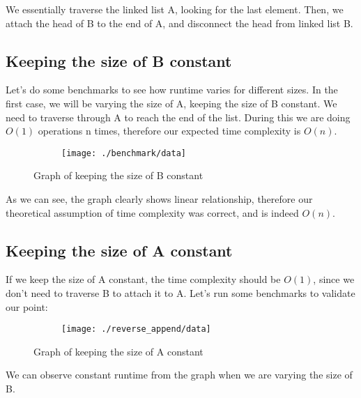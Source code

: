 \documentclass[a4paper,11pt]{article}
\begin{document}
    We essentially traverse the linked list A, looking for the last element.
    Then, we attach the head of B to the end of A, and disconnect the head from linked list B.

    \subsection*{Keeping the size of B constant}

    Let's do some benchmarks to see how runtime varies for different sizes.
    In the first case, we will be varying the size of A, keeping the size of B constant.
    We need to traverse through A to reach the end of the list.
    During this we are doing $O(1)$ operations n times, therefore our expected time complexity is $O(n)$.

    \begin{figure}[h]
        \centering
        \begin{subfigure}[b]{.5\textwidth}
            \centering
            \texttt{[image: ./benchmark/data]} %
        \end{subfigure}
        \caption{Graph of keeping the size of B constant}
        \label{fig:graph_1}
    \end{figure}

    As we can see, the graph clearly shows linear relationship, therefore our theoretical assumption of time complexity was correct, and is indeed $O(n)$.

    \subsection*{Keeping the size of A constant}

    If we keep the size of A constant, the time complexity should be $O(1)$, since we don't need to traverse B to attach it to A.
    Let's run some benchmarks to validate our point:

    \begin{figure}[h]
        \centering
        \begin{subfigure}[b]{.5\textwidth}
            \centering
            \texttt{[image: ./reverse\_append/data]} %
        \end{subfigure}
        \caption{Graph of keeping the size of A constant}
        \label{fig:graph_2}
    \end{figure}

    We can observe constant runtime from the graph when we are varying the size of B\@.
\end{document}
